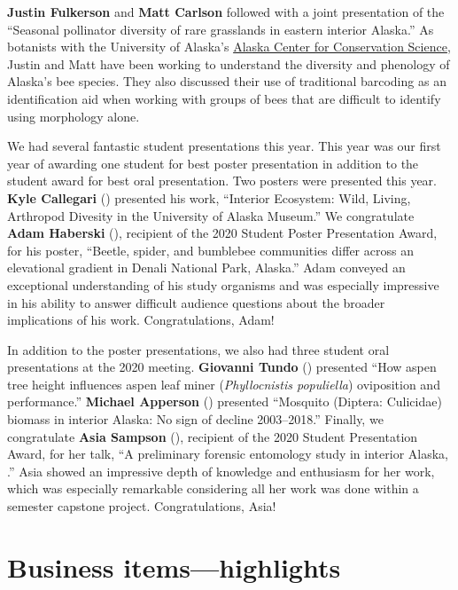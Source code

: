 \begin{multicols}{2}
\textbf{Justin Fulkerson} and \textbf{Matt Carlson} followed with a joint presentation of the ``Seasonal pollinator diversity of rare grasslands in eastern interior Alaska.'' As botanists with the University of Alaska’s \href{https://accs.uaa.alaska.edu/}{Alaska Center for Conservation Science}, Justin and Matt have been working to understand the diversity and phenology of Alaska’s bee species. They also discussed their use of traditional barcoding as an identification aid when working with groups of bees that are difficult to identify using morphology alone.

We had several fantastic student presentations this year. This year was our first year of awarding one student for best poster presentation in addition to the student award for best oral presentation. Two posters were presented this year. \textbf{Kyle Callegari} () presented his work, ``Interior Ecosystem: Wild, Living, Arthropod Divesity in the University of Alaska Museum.'' We congratulate \textbf{Adam Haberski} (), recipient of the 2020 Student Poster Presentation Award, for his poster, ``Beetle, spider, and bumblebee communities differ across an elevational gradient in Denali National Park, Alaska.'' Adam conveyed an exceptional understanding of his study organisms and was especially impressive in his ability to answer difficult audience questions about the broader implications of his work. Congratulations, Adam!

In addition to the poster presentations, we also had three student oral presentations at the 2020 meeting. \textbf{Giovanni Tundo} () presented ``How aspen tree height influences aspen leaf miner (\textit{Phyllocnistis populiella}) oviposition and performance.'' \textbf{Michael Apperson} () presented ``Mosquito (Diptera: Culicidae) biomass in interior Alaska: No sign of decline 2003--2018.'' Finally, we congratulate \textbf{Asia Sampson} (), recipient of the 2020 Student Presentation Award, for her talk, ``A preliminary forensic entomology study in interior Alaska, .'' Asia showed an impressive depth of knowledge and enthusiasm for her work, which was especially remarkable considering all her work was done within a semester capstone project. Congratulations, Asia!
	
\section{Business items---highlights}

\begin{itemize}


\end{itemize}
\end{multicols}
